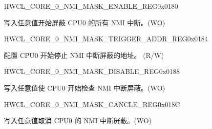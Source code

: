 \begin{register}{H}{WCL\_CORE\_0\_NMI\_MASK\_ENABLE\_REG}{0x{}0180}\label{regdesc:WCLCORE0NMIMASKENABLEREG}
%
\regnewline%
\begin{regdesc}\begin{reglist}
\label{fielddesc:WCLCORE0NMIMASKENABLE}\item [WCL\_CORE\_0\_NMI\_MASK\_ENABLE] 写入任意值开始屏蔽 CPU0 的所有 NMI 中断。(WO)
\end{reglist}\end{regdesc}
\end{register}


\begin{register}{H}{WCL\_CORE\_0\_NMI\_MASK\_TRIGGER\_ADDR\_REG}{0x{}0184}\label{regdesc:WCLCORE0NMIMASKTRIGGERADDRREG}
%
\regnewline%
\begin{regdesc}\begin{reglist}
\label{fielddesc:WCLCORE0NMIMASKTRIGGERADDR}\item [WCL\_CORE\_0\_NMI\_MASK\_TRIGGER\_ADDR] 配置 CPU0 开始停止 NMI 中断屏蔽的地址。 (R/W)
\end{reglist}\end{regdesc}
\end{register}


\begin{register}{H}{WCL\_CORE\_0\_NMI\_MASK\_DISABLE\_REG}{0x{}0188}\label{regdesc:WCLCORE0NMIMASKDISABLEREG}
%
\regnewline%
\begin{regdesc}\begin{reglist}
\label{fielddesc:WCLCORE0NMIMASKDISABLE}\item [WCL\_CORE\_0\_NMI\_MASK\_DISABLE] 写入任意值使 CPU0 开始检查 NMI 中断屏蔽。(WO)
\end{reglist}\end{regdesc}
\end{register}


\begin{register}{H}{WCL\_CORE\_0\_NMI\_MASK\_CANCLE\_REG}{0x{}018C}\label{regdesc:WCLCORE0NMIMASKCANCLEREG}
%
\regnewline%
\begin{regdesc}\begin{reglist}
\label{fielddesc:WCLCORE0NMIMASKCANCEL}\item [WCL\_CORE\_0\_NMI\_MASK\_CANCEL] 写入任意值取消 CPU0 的 NMI 中断屏蔽。(WO)
\end{reglist}\end{regdesc}
\end{register}


